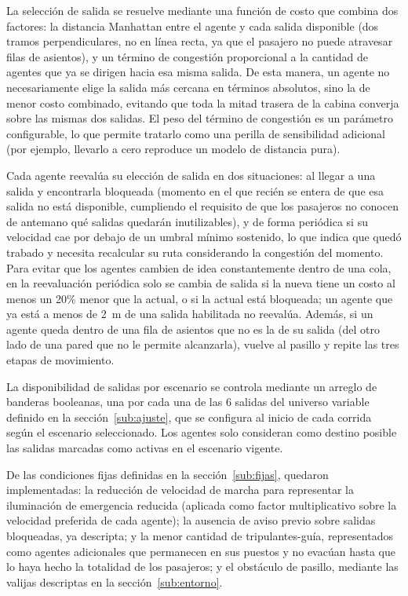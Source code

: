 \documentclass[a4paper, 11pt]{article}
\begin{document}
La selecci\'on de salida se resuelve mediante una funci\'on de costo que combina dos
factores: la distancia Manhattan entre el agente y cada salida disponible (dos
tramos perpendiculares, no en l\'inea recta, ya que el pasajero no puede atravesar
filas de asientos), y un t\'ermino de congesti\'on proporcional a la cantidad de
agentes que ya se dirigen hacia esa misma salida. De esta manera, un agente no
necesariamente elige la salida m\'as cercana en t\'erminos absolutos, sino la de
menor costo combinado, evitando que toda la mitad trasera de la cabina converja
sobre las mismas dos salidas. El peso del t\'ermino de congesti\'on es un
par\'ametro configurable, lo que permite tratarlo como una perilla de sensibilidad
adicional (por ejemplo, llevarlo a cero reproduce un modelo de distancia pura).

Cada agente reeval\'ua su elecci\'on de salida en dos situaciones: al llegar a una
salida y encontrarla bloqueada (momento en el que reci\'en se entera de que esa
salida no est\'a disponible, cumpliendo el requisito de que los pasajeros no conocen
de antemano qu\'e salidas quedar\'an inutilizables), y de forma peri\'odica si su
velocidad cae por debajo de un umbral m\'inimo sostenido, lo que indica que qued\'o
trabado y necesita recalcular su ruta considerando la congesti\'on del momento.
Para evitar que los agentes cambien de idea constantemente dentro de una cola, en
la reevaluaci\'on peri\'odica solo se cambia de salida si la nueva tiene un costo al
menos un 20\% menor que la actual, o si la actual est\'a bloqueada; un agente que ya
est\'a a menos de 2~m de una salida habilitada no reeval\'ua. Adem\'as, si un agente
queda dentro de una fila de asientos que no es la de su salida (del otro lado de
una pared que no le permite alcanzarla), vuelve al pasillo y repite las tres
etapas de movimiento.

La disponibilidad de salidas por escenario se controla mediante un arreglo de
banderas booleanas, una por cada una de las 6 salidas del universo variable definido
en la secci\'on~\ref{sub:ajuste}, que se configura al inicio de cada corrida seg\'un el escenario
seleccionado. Los agentes solo consideran como destino posible las salidas marcadas
como activas en el escenario vigente.

De las condiciones fijas definidas en la secci\'on~\ref{sub:fijas}, quedaron implementadas: la
reducci\'on de velocidad de marcha para representar la iluminaci\'on de emergencia
reducida (aplicada como factor multiplicativo sobre la velocidad preferida de cada
agente); la ausencia de aviso previo sobre salidas bloqueadas, ya descripta; y la
menor cantidad de tripulantes-gu\'ia, representados como agentes adicionales que
permanecen en sus puestos y no evac\'uan hasta que lo haya hecho la totalidad de los
pasajeros; y el obst\'aculo de pasillo, mediante las valijas descriptas en la
secci\'on~\ref{sub:entorno}.
\end{document}
